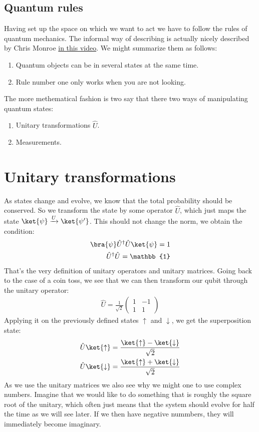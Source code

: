 \subsection{Quantum rules}
Having set up the space on which we want to act we have to follow the rules of quantum mechanics. The informal way of describing is actually nicely described by Chris Monroe \href{https://youtu.be/CC7nlBM2cSM}{in this video}. We might summarize them as follows:
\begin{enumerate}
\item Quantum objects can be in several states at the same time.
\item Rule number one only works when you are not looking.
\end{enumerate}

The more methematical fashion is two say that there two ways of manipulating quantum states:
\begin{enumerate}
\item Unitary transformations $\hat{U}$.
\item Measurements.
\end{enumerate}

\section{Unitary transformations}
As states change and evolve, we know that the total probability should be conserved. So we transform the state by some operator $\hat{U}$, which just maps the state $\ket{\psi}\xrightarrow[]{U}\ket{\psi'}$. This should not change the norm, we obtain the condition:
\begin{align}
\bra{\psi}\hat{U}^\dag\hat{U} \ket{\psi} = 1\\
\hat{U}^\dag\hat{U}  = \mathbb{1}
\end{align}
That's the very definition of unitary operators and unitary matrices.
Going back to the case of a coin toss, we see that we can then transform our qubit through the unitary operator:
\begin{align}
\hat{U}=\frac{1}{\sqrt{2}}\left(\begin{array}{cc}
1 & -1\\
1 & 1
\end{array}\right)
\end{align}
Applying it on the previously defined states $\uparrow$ and $\downarrow$, we get the superposition state:
\begin{align}
\hat{U}\ket{\uparrow} &= \frac{\ket{\uparrow}-\ket{\downarrow}}{\sqrt{2}}\\
\hat{U}\ket{\downarrow} &= \frac{\ket{\uparrow}+\ket{\downarrow}}{\sqrt{2}}
\end{align}
As we use the unitary matrices we also see why we might one to use complex numbers. Imagine that we would like to do something that is roughly the square root of the unitary, which often just means that the system should evolve for half the time as we will see later. If we then have negative nummbers, they will immediately become imaginary.

